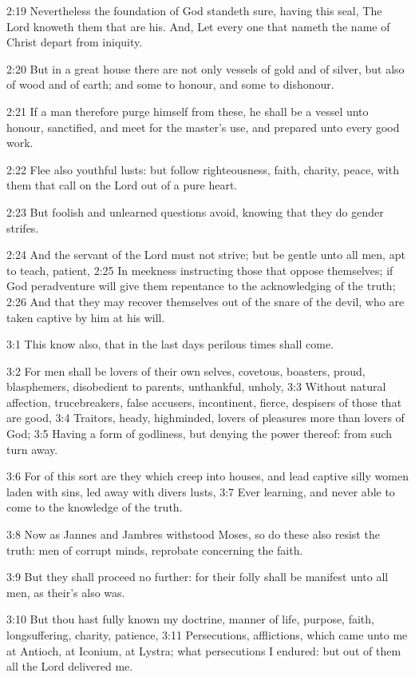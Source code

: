 2:19 Nevertheless the foundation of God standeth sure, having this seal, The Lord knoweth them that are his. And, Let every one that nameth the name of Christ depart from iniquity.

2:20 But in a great house there are not only vessels of gold and of silver, but also of wood and of earth; and some to honour, and some to dishonour.

2:21 If a man therefore purge himself from these, he shall be a vessel unto honour, sanctified, and meet for the master's use, and prepared unto every good work.

2:22 Flee also youthful lusts: but follow righteousness, faith, charity, peace, with them that call on the Lord out of a pure heart.

2:23 But foolish and unlearned questions avoid, knowing that they do gender strifes.

2:24 And the servant of the Lord must not strive; but be gentle unto all men, apt to teach, patient, 2:25 In meekness instructing those that oppose themselves; if God peradventure will give them repentance to the acknowledging of the truth; 2:26 And that they may recover themselves out of the snare of the devil, who are taken captive by him at his will.

3:1 This know also, that in the last days perilous times shall come.

3:2 For men shall be lovers of their own selves, covetous, boasters, proud, blasphemers, disobedient to parents, unthankful, unholy, 3:3 Without natural affection, trucebreakers, false accusers, incontinent, fierce, despisers of those that are good, 3:4 Traitors, heady, highminded, lovers of pleasures more than lovers of God; 3:5 Having a form of godliness, but denying the power thereof: from such turn away.

3:6 For of this sort are they which creep into houses, and lead captive silly women laden with sins, led away with divers lusts, 3:7 Ever learning, and never able to come to the knowledge of the truth.

3:8 Now as Jannes and Jambres withstood Moses, so do these also resist the truth: men of corrupt minds, reprobate concerning the faith.

3:9 But they shall proceed no further: for their folly shall be manifest unto all men, as their's also was.

3:10 But thou hast fully known my doctrine, manner of life, purpose, faith, longsuffering, charity, patience, 3:11 Persecutions, afflictions, which came unto me at Antioch, at Iconium, at Lystra; what persecutions I endured: but out of them all the Lord delivered me.

